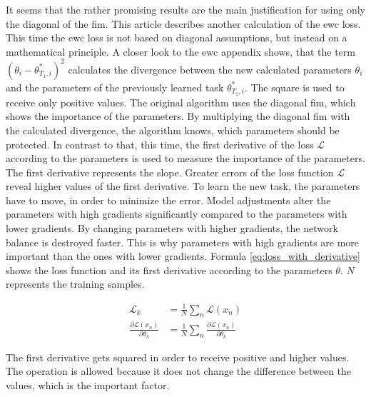 It seems that the rather promising results are the main justification for using only the diagonal of the \acrshort{fim}.
\newline
This article describes another calculation of the \acrshort{ewc} loss.
This time the \acrshort{ewc} loss is not based on diagonal assumptions, but instead on a mathematical principle.
\newline
A closer look to the \acrshort{ewc} appendix shows, that the term $(\theta_i - \theta^*_{T_1,i})^2$ calculates the divergence between the new calculated parameters $\theta_i$ and the parameters of the previously learned task $\theta^*_{T_1,i}$.
The square is used to receive only positive values.
\newline
The original algorithm uses the diagonal \acrshort{fim}, which shows the importance of the parameters.
By multiplying the diagonal \acrshort{fim} with the calculated divergence, the algorithm knows, which parameters should be protected.
\newline
In contrast to that, this time, the first derivative of the loss $\mathcal{L}$ according to the parameters is used to measure the importance of the parameters.
The first derivative represents the slope.
Greater errors of the loss function  $\mathcal{L}$ reveal higher values of the first derivative.
To learn the new task, the parameters have to move, in order to minimize the error.
Model adjustments alter the parameters with high gradients significantly compared to the parameters with lower gradients.
By changing parameters with higher gradients, the network balance is destroyed faster.
This is why parameters with high gradients are more important than the ones with lower gradients.
\newline
Formula \ref{eq:loss_with_derivative} shows the loss function and its first derivative according to the parameters $\theta$. $N$ represents the training samples.

\begin{equation}
    \begin{split}
        \mathcal{L}_k & = 
        \frac{1}{N}
        \sum_{n} 
            \mathcal{L}(x_n)
        \\
        \frac{\partial \mathcal{L}(x_n)}{\partial \theta_k} & = 
        \frac{1}{N}
        \sum_{n} 
            \frac{\partial \mathcal{L}(x_n)}{\partial \theta_k}
    \end{split}
    \label{eq:loss_with_derivative}
\end{equation}

The first derivative gets squared in order to receive positive and higher values.
The operation is allowed because it does not change the difference between the values, which is the important factor.

